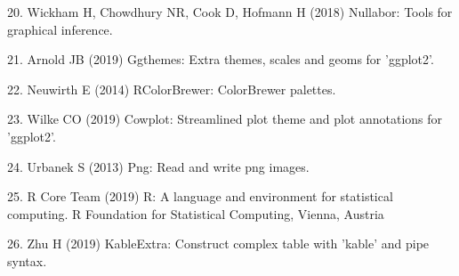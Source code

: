 \documentclass[conference,final,]{IEEEtran}
\begin{document}
\leavevmode\hypertarget{ref-nullabor}{}%
20. Wickham H, Chowdhury NR, Cook D, Hofmann H (2018) Nullabor: Tools for graphical inference.

\leavevmode\hypertarget{ref-ggthemes}{}%
21. Arnold JB (2019) Ggthemes: Extra themes, scales and geoms for 'ggplot2'.

\leavevmode\hypertarget{ref-RColorBrewer}{}%
22. Neuwirth E (2014) RColorBrewer: ColorBrewer palettes.

\leavevmode\hypertarget{ref-cowplot}{}%
23. Wilke CO (2019) Cowplot: Streamlined plot theme and plot annotations for 'ggplot2'.

\leavevmode\hypertarget{ref-png}{}%
24. Urbanek S (2013) Png: Read and write png images.

\leavevmode\hypertarget{ref-grid}{}%
25. R Core Team (2019) R: A language and environment for statistical computing. R Foundation for Statistical Computing, Vienna, Austria

\leavevmode\hypertarget{ref-kableExtra}{}%
26. Zhu H (2019) KableExtra: Construct complex table with 'kable' and pipe syntax.
\end{document}
